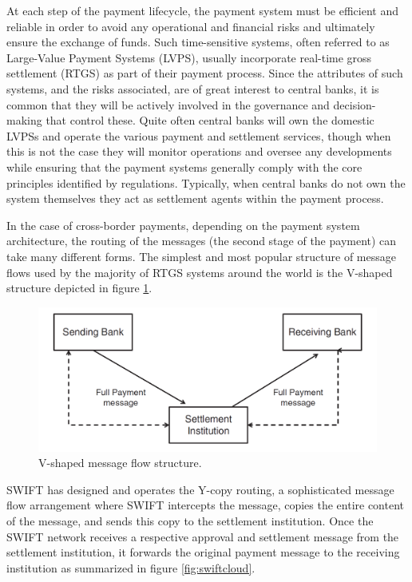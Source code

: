 \documentclass[12pt]{article}
\begin{document}
        At each step of the payment lifecycle, the payment system must be efficient and reliable in order to avoid any operational and financial risks and ultimately ensure the exchange of funds. Such time-sensitive systems, often referred to as Large-Value Payment Systems (LVPS), usually incorporate real-time gross settlement (RTGS) as part of their payment process. Since the attributes of such systems, and the risks associated, are of great interest to central banks, it is common that they will be actively involved in the governance and decision-making that control these. Quite often central banks will own the domestic LVPSs and operate the various payment and settlement services, though when this is not the case they will monitor operations and oversee any developments while ensuring that the payment systems generally comply with the core principles identified by regulations. Typically, when central banks do not own the system themselves they act as settlement agents within the payment process. 
        
        In the case of cross-border payments, depending on the payment system architecture, the routing of the messages (the second stage of the payment) can take many different forms. The simplest and most popular structure of message flows used by the majority of RTGS systems around the world is the V-shaped structure depicted in figure \ref{fig:vshape}.
        
        \begin{figure}[H]
        \centering
        \includegraphics[width=\textwidth]{figures/vshape.png}
        \caption{V-shaped message flow structure.}
        \label{fig:vshape}
        \end{figure}
        
        SWIFT has designed and operates the Y-copy routing, a sophisticated message flow arrangement where SWIFT intercepts the message, copies the entire content of the message, and sends this copy to the settlement institution. Once the SWIFT network receives a respective approval and settlement message from the settlement institution, it forwards the original payment message to the receiving institution as summarized in figure \ref{fig:swiftcloud}.
        
\end{document}

